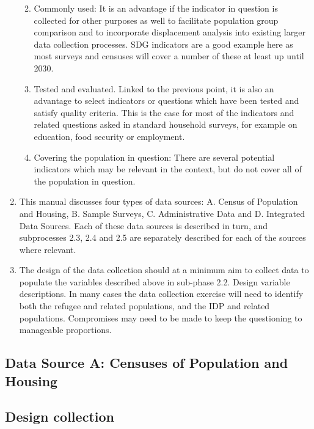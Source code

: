 \documentclass[
]{article}
\begin{document}
\begin{enumerate}
  \begin{enumerate}
  \def\labelenumii{\arabic{enumii}.}
  \setcounter{enumii}{5}
  \item
    Commonly used: It is an advantage if the indicator in question
    is collected for other purposes as well to facilitate population
    group comparison and to incorporate displacement analysis into
    existing larger data collection processes. SDG indicators are a
    good example here as most surveys and censuses will cover a
    number of these at least up until 2030.
  \item
    Tested and evaluated. Linked to the previous point, it is also
    an advantage to select indicators or questions which have been
    tested and satisfy quality criteria. This is the case for most
    of the indicators and related questions asked in standard
    household surveys, for example on education, food security or
    employment.
  \item
    Covering the population in question: There are several potential
    indicators which may be relevant in the context, but do not
    cover all of the population in question.
  \end{enumerate}
\item
  This manual discusses four types of data sources: A. Census of
  Population and Housing, B. Sample Surveys, C. Administrative Data
  and D. Integrated Data Sources. Each of these data sources is
  described in turn, and subprocesses 2.3, 2.4 and 2.5 are separately
  described for each of the sources where relevant.
\item
  The design of the data collection should at a minimum aim to collect
  data to populate the variables described above in sub-phase 2.2.
  Design variable descriptions. In many cases the data collection
  exercise will need to identify both the refugee and related
  populations, and the IDP and related populations. Compromises may
  need to be made to keep the questioning to manageable proportions.
\end{enumerate}

\hypertarget{data-source-a-censuses-of-population-and-housing}{%
\subsection{Data Source A: Censuses of Population and Housing}\label{data-source-a-censuses-of-population-and-housing}}

\hypertarget{design-collection}{%
\subsection{Design collection}\label{design-collection}}
\end{document}
